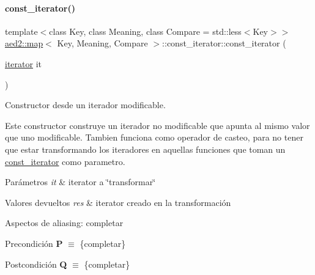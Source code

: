 \mbox{\label{classaed2_1_1map_1_1const__iterator_ab7924d90cbf6d19bec62514d10b62fb3_ab7924d90cbf6d19bec62514d10b62fb3}} 
\paragraph{\texorpdfstring{const\+\_\+iterator()}{const\_iterator()}\hspace{0.1cm}{\footnotesize\ttfamily [2/3]}}
{\footnotesize\ttfamily template$<$class Key, class Meaning, class Compare = std\+::less$<$\+Key$>$$>$ \\
\hyperlink{classaed2_1_1map}{aed2\+::map}$<$ Key, Meaning, Compare $>$\+::const\+\_\+iterator\+::const\+\_\+iterator (\begin{DoxyParamCaption}\item[{\hyperlink{classaed2_1_1map_1_1iterator}{iterator}}]{it }\end{DoxyParamCaption})\hspace{0.3cm}{\ttfamily [inline]}}



Constructor desde un iterador modificable. 

Este constructor construye un iterador no modificable que apunta al mismo valor que uno modificable. Tambien funciona como operador de casteo, para no tener que estar transformando los iteradores en aquellas funciones que toman un {\ttfamily \hyperlink{classaed2_1_1map_1_1const__iterator}{const\+\_\+iterator}} como parametro.


\begin{DoxyParams}{Parámetros}
{\em it} & iterator a \char`\"{}transformar\char`\"{} \\
\hline
\end{DoxyParams}

\begin{DoxyRetVals}{Valores devueltos}
{\em res} & iterator creado en la transformación\\
\hline
\end{DoxyRetVals}
\begin{DoxyParagraph}{Aspectos de aliasing\+:}
completar
\end{DoxyParagraph}
\begin{DoxyPrecond}{Precondición}
{\bfseries P} $\equiv$ \{completar\} 
\end{DoxyPrecond}
\begin{DoxyPostcond}{Postcondición}
{\bfseries Q} $\equiv$ \{completar\}
\end{DoxyPostcond}

